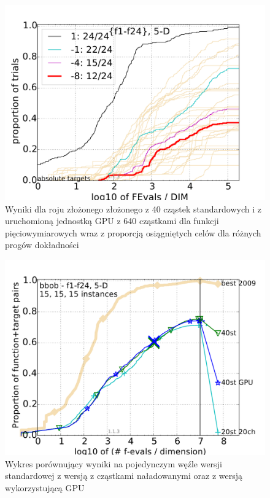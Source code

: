 \documentclass[12pt, twoside, openany, abstract=on]{report}
\theoremstyle{definition}
\begin{document}
\begin{figure}[H]
    \centering
    \includegraphics[scale=1]{charts/1node40stGPU_5D.pdf} 
 \caption{Wyniki dla roju złożonego złożonego z 40 cząstek standardowych i z uruchomioną jednostką GPU z 640 cząstkami dla funkcji pięciowymiarowych wraz z proporcją osiągniętych celów dla różnych progów dokładności}
\end{figure}


\begin{figure}[H]
    \includegraphics[scale=1]{charts/1nodeCompare_5D.pdf} \par
 \caption{Wykres porównujący wyniki na pojedynczym węźle wersji standardowej z wersją z cząstkami naładowanymi oraz z wersją wykorzystującą GPU}
\end{figure}
\end{document}
